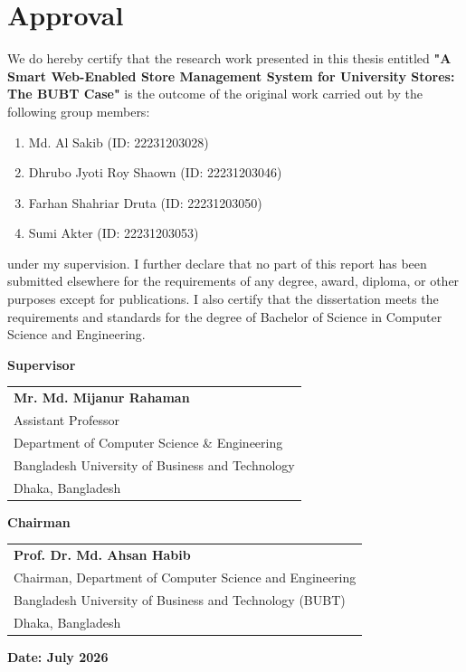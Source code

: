 \chapter*{Approval}

We do hereby certify that the research work presented in this thesis entitled \textbf{"A Smart Web-Enabled Store Management System for University Stores: The BUBT Case"} is the outcome of the original work carried out by the following group members:

\begin{enumerate}
\item Md. Al Sakib (ID: 22231203028)
\item Dhrubo Jyoti Roy Shaown (ID: 22231203046)
\item Farhan Shahriar Druta (ID: 22231203050)
\item Sumi Akter (ID: 22231203053)
\end{enumerate}

under my supervision. I further declare that no part of this report has been submitted elsewhere for the requirements of any degree, award, diploma, or other purposes except for publications. I also certify that the dissertation meets the requirements and standards for the degree of Bachelor of Science in Computer Science and Engineering.

\vfill

\begin{center}
\textbf{Supervisor}
\end{center}

\vspace{0.5cm}

\begin{tabular}{p{3in}}
\hline
\textbf{Mr. Md. Mijanur Rahaman}\\
Assistant Professor\\
Department of Computer Science \& Engineering\\
Bangladesh University of Business and Technology\\
Dhaka, Bangladesh\\
\end{tabular}

\vfill

\begin{center}
\textbf{Chairman}
\end{center}

\vspace{0.5cm}

\begin{tabular}{p{3in}}
\hline
\textbf{Prof. Dr. Md. Ahsan Habib}\\
Chairman, Department of Computer Science and Engineering\\
Bangladesh University of Business and Technology (BUBT)\\
Dhaka, Bangladesh\\
\end{tabular}

\vspace{1cm}

\begin{center}
\textbf{Date: July 2026}
\end{center}